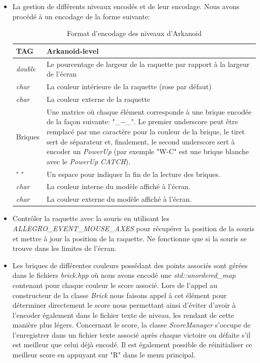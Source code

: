 \documentclass[utf8]{article}
\begin{document}
\begin{itemize}
    \item La gestion de différents niveaux encodés et de leur encodage. Nous avons procédé à un encodage de la forme suivante:
    \newpage
    \begin{table}[]
    \centering
    \begin{tabular}{|l|p{15cm}|}
         \hline
         TAG & Arkanoid-level  \\ \hline
         \emph{double} & Le pourcentage de largeur de la raquette par rapport à la largeur de l'écran \\ \hline
         \emph{char} & La couleur intérieure de la raquette (rose par défaut) \\ \hline
         \emph{char} & La couleur externe de la raquette \\ \hline
         Briques & Une matrice où chaque élément corresponde à une brique encodée de la façon suivante: "\_$-$\_". Le premier underscore peut être remplacé par une caractère pour la couleur de la brique, le tiret sert de séparateur et, finalement, le second underscore sert à encoder un \emph{PowerUp} (par exemple "W-C" est une brique blanche avec le \emph{PowerUp} \emph{CATCH}). \\ \hline
         " " & Un espace pour indiquer la fin de la lecture des briques. \\ \hline
         \emph{char} & La couleur interne du modèle affiché à l'écran. \\ \hline
         \emph{char} & La couleur externe du modèle affiché à l'écran. \\ \hline
    \end{tabular}
    \caption{Format d'encodage des niveaux d'Arkanoid}
    \label{tab:placeholder}
    \end{table}
    \item Contrôler la raquette avec la souris en utilisant les \emph{ALLEGRO\_EVENT\_MOUSE\_AXES} pour récupérer la position de la souris et mettre à jour la position de la raquette. Ne fonctionne que si la souris se trouve dans les limites de l'écran.
    \item Les briques de différentes couleurs possédant des points associés sont gérées dans le fichiers \emph{brick.hpp} où nous avons encodé une \emph{std::unordered\_map} contenant pour chaque couleur le score associé. Lors de l'appel au constructeur de la classe \emph{Brick} nous faisons appel à cet élément pour déterminer directement le score nous permettant ainsi d'éviter d'avoir à l'encoder également dans le fichier texte de niveau, les rendant de cette manière plus légers. Concernant le score, la classe \emph{ScoreManager} s'occupe de l'enregistrer dans un fichier texte associé après chaque victoire ou défaite s'il est meilleur que celui déjà encodé. Il est également possible de réinitialiser ce meilleur score en appuyant sur "R" dans le menu principal.

\end{itemize}
\end{document}
